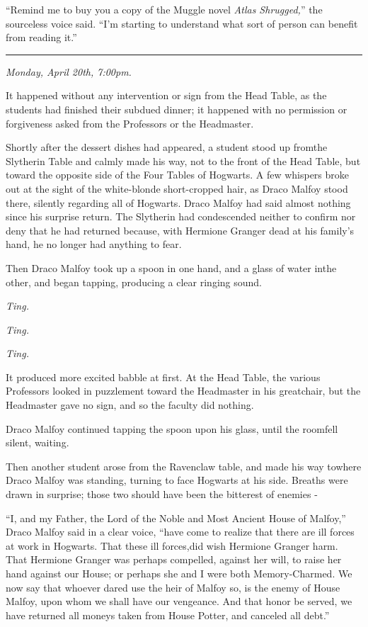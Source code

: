 ``Remind me to buy you a copy of the Muggle novel \emph{Atlas Shrugged,}'' the sourceless voice said. ``I'm starting to understand what sort of person can benefit from reading it.''

\begin{center}\rule{3in}{0.4pt}\end{center}

\emph{Monday, April 20th, 7:00pm.}

It happened without any intervention or sign from the Head Table, as the students had finished their subdued dinner; it happened with no permission or forgiveness asked from the Professors or the Headmaster.

Shortly after the dessert dishes had appeared, a student stood up fromthe Slytherin Table and calmly made his way, not to the front of the Head Table, but toward the opposite side of the Four Tables of Hogwarts. A few whispers broke out at the sight of the white-blonde short-cropped hair, as Draco Malfoy stood there, silently regarding all of Hogwarts. Draco Malfoy had said almost nothing since his surprise return. The Slytherin had condescended neither to confirm nor deny that he had returned because, with Hermione Granger dead at his family's hand, he no longer had anything to fear.

Then Draco Malfoy took up a spoon in one hand, and a glass of water inthe other, and began tapping, producing a clear ringing sound.

\emph{Ting.}

\emph{Ting.}

\emph{Ting.}

It produced more excited babble at first. At the Head Table, the various Professors looked in puzzlement toward the Headmaster in his greatchair, but the Headmaster gave no sign, and so the faculty did nothing.

Draco Malfoy continued tapping the spoon upon his glass, until the roomfell silent, waiting.

Then another student arose from the Ravenclaw table, and made his way towhere Draco Malfoy was standing, turning to face Hogwarts at his side. Breaths were drawn in surprise; those two should have been the bitterest of enemies -

``I, and my Father, the Lord of the Noble and Most Ancient House of Malfoy,'' Draco Malfoy said in a clear voice, ``have come to realize that there are ill forces at work in Hogwarts. That these ill forces,did wish Hermione Granger harm. That Hermione Granger was perhaps compelled, against her will, to raise her hand against our House; or perhaps she and I were both Memory-Charmed. We now say that whoever dared use the heir of Malfoy so, is the enemy of House Malfoy, upon whom we shall have our vengeance. And that honor be served, we have returned all moneys taken from House Potter, and canceled all debt.''

